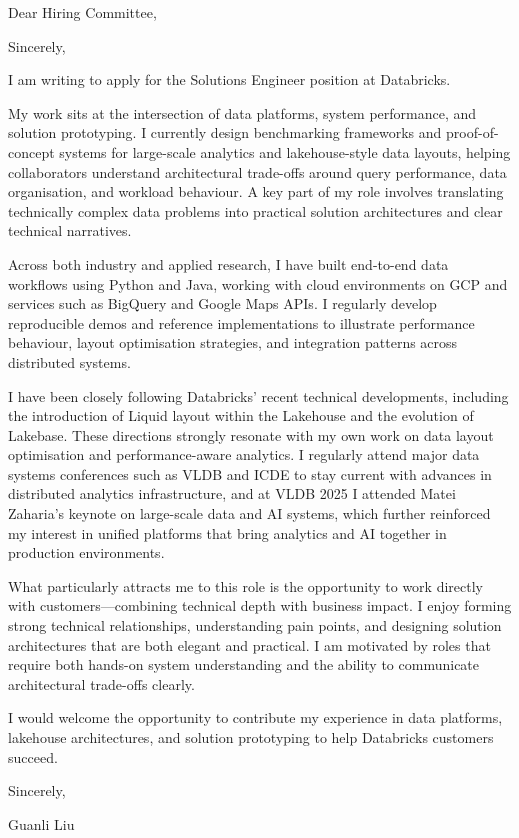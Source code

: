 \documentclass[11pt,a4paper]{moderncv}
\begin{document}
\date{\today}
\opening{Dear Hiring Committee,}
\closing{Sincerely,}
\makelettertitle

I am writing to apply for the Solutions Engineer position at Databricks.

My work sits at the intersection of data platforms, system performance, and solution prototyping. I currently design benchmarking frameworks and proof-of-concept systems for large-scale analytics and lakehouse-style data layouts, helping collaborators understand architectural trade-offs around query performance, data organisation, and workload behaviour. A key part of my role involves translating technically complex data problems into practical solution architectures and clear technical narratives.

Across both industry and applied research, I have built end-to-end data workflows using Python and Java, working with cloud environments on GCP and services such as BigQuery and Google Maps APIs. I regularly develop reproducible demos and reference implementations to illustrate performance behaviour, layout optimisation strategies, and integration patterns across distributed systems.

I have been closely following Databricks’ recent technical developments, including the introduction of Liquid layout within the Lakehouse and the evolution of Lakebase. These directions strongly resonate with my own work on data layout optimisation and performance-aware analytics. I regularly attend major data systems conferences such as VLDB and ICDE to stay current with advances in distributed analytics infrastructure, and at VLDB 2025 I attended Matei Zaharia’s keynote on large-scale data and AI systems, which further reinforced my interest in unified platforms that bring analytics and AI together in production environments.

What particularly attracts me to this role is the opportunity to work directly with customers—combining technical depth with business impact. I enjoy forming strong technical relationships, understanding pain points, and designing solution architectures that are both elegant and practical. I am motivated by roles that require both hands-on system understanding and the ability to communicate architectural trade-offs clearly.

I would welcome the opportunity to contribute my experience in data platforms, lakehouse architectures, and solution prototyping to help Databricks customers succeed.

\vspace{1cm}

Sincerely,

\vspace{0.5cm}

Guanli Liu
\end{document}
